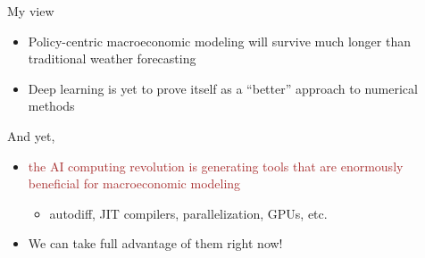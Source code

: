 \documentclass[
    xcolor={svgnames,dvipsnames},
    hyperref={colorlinks, citecolor=DeepPink4, linkcolor=DarkRed, urlcolor=DarkBlue}
    ]{beamer}  %
\newcommand{\brown}[1]{\textcolor{Brown}{\sf #1}}
\newcommand{\1}{\mathbbm 1}
\begin{document}
\begin{frame}
    
    My view

    \begin{itemize}
        \item Policy-centric macroeconomic modeling will survive much longer
            than traditional weather forecasting
        \vspace{0.5em}
        \item Deep learning is yet to prove itself as a ``better'' approach to
            numerical methods
        \vspace{0.5em}
    \end{itemize}

    \pause
    And yet, 

    \begin{itemize}
        \item \brown{the AI computing revolution is
            generating tools that are enormously beneficial for macroeconomic
        modeling}
        \vspace{0.5em}
            \begin{itemize}
                \item autodiff, JIT compilers, parallelization, GPUs, etc.
            \end{itemize}
        \vspace{0.5em}
        \item We can take full advantage of them right now!
    \end{itemize}


\end{frame}
\end{document}
